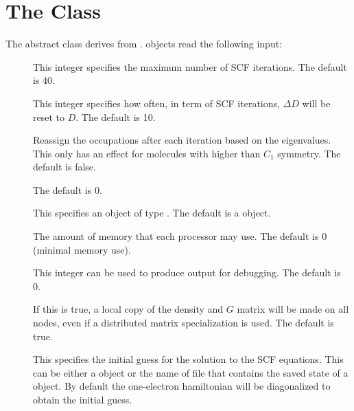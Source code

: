 

\section{The  Class}
\label{SCF}

The  abstract class derives from .
 objects read the following input:

\begin{description}
  \item[]  This integer specifies the maximum number of
     SCF iterations.  The default is 40.

  \item[] This integer specifies how
     often, in term of SCF iterations, $\Delta D$ will be reset to $D$.
     The default is 10.

  \item[] Reassign the occupations after each
     iteration based on the eigenvalues.  This only has an effect for
     molecules with higher than $C_1$ symmetry.  The default is false.

  \item[] The default is 0.

  \item[] This specifies an object of type
     .  The default is a
      object.

  \item[] The amount of memory that each processor may use.
     The default is 0 (minimal memory use).

  \item[] This integer can be used to produce output for
     debugging.  The default is 0.

  \item[] If this is true, a local copy of the
     density and $G$ matrix will be made on all nodes, even if a
     distributed matrix specialization is used.  The default is true.

  \item[] This specifies the initial guess for
     the solution to the SCF equations.  This can be either a
      object or the name of file that
     contains the saved state of a  object.
     By default the one-electron hamiltonian will be diagonalized to obtain
     the initial guess.

\end{description}

